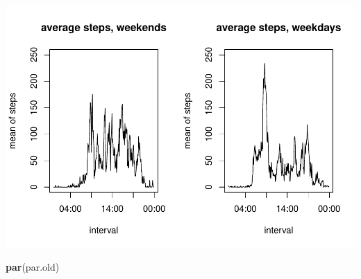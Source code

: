 \documentclass[]{article}
\newenvironment{Shaded}{\begin{snugshade}}{\end{snugshade}}
\newcommand{\KeywordTok}[1]{\textcolor[rgb]{0.13,0.29,0.53}{\textbf{#1}}}
\newcommand{\NormalTok}[1]{#1}
\begin{document}
\includegraphics{PA1_template_files/figure-latex/unnamed-chunk-7-1.pdf}

\begin{Shaded}
\begin{Highlighting}[]
\KeywordTok{par}\NormalTok{(par.old)}
\end{Highlighting}
\end{Shaded}
\end{document}
